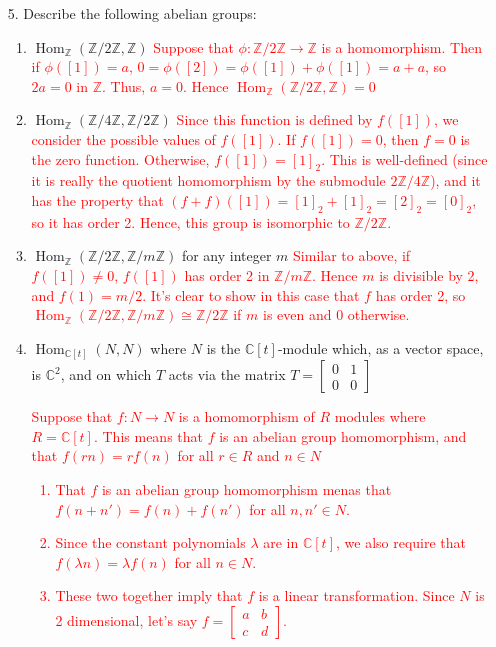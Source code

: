 \documentclass[12pt]{article}
\newcommand{\bbC}{\mathbb{C}}
\newcommand{\bbZ}{\mathbb{Z}}
\newcommand{\Hom}{\operatorname{Hom}}
\newcommand{\solution}[1]{\textcolor{red}{#1}}
\begin{document}
\begin{enumerate}
\item[5.] Describe the following abelian groups:
  \begin{enumerate}
  \item $\Hom_\bbZ (\bbZ/2\bbZ, \bbZ)$
\solution{Suppose that $\phi: \bbZ/2\bbZ\rightarrow \bbZ$ is a
  homomorphism. Then if $\phi([1])=a$,
  $0=\phi([2])=\phi([1])+\phi([1]) = a+a$, so $2a=0$ in $\bbZ$. Thus,
  $a=0$. Hence $\Hom_\bbZ(\bbZ/2\bbZ, \bbZ) = 0$}
  \item $\Hom_\bbZ (\bbZ/4\bbZ, \bbZ/2\bbZ)$
\solution{Since this function is defined by $f([1])$, we consider the
  possible values of $f([1])$. If $f([1])=0$, then $f=0$ is the zero
  function. Otherwise, $f([1])=[1]_2$. This is well-defined (since it
  is really the quotient homomorphism by the submodule $2\bbZ/4\bbZ$),
  and it has the property that $(f+f)([1])=[1]_2+[1]_2 = [2]_2 =
  [0]_2$, so it has order 2. Hence, this group is isomorphic to
  $\bbZ/2\bbZ$. }
  \item $\Hom_\bbZ(\bbZ/2\bbZ, \bbZ/m\bbZ)$ for any integer $m$
\solution{
Similar to above, if $f([1])\neq 0$, $f([1])$ has order 2 in
$\bbZ/m\bbZ$. Hence $m$ is divisible by 2, and $f(1)=m/2$. It's clear
to show in this case that $f$ has order 2, so $\Hom_\bbZ(\bbZ/2\bbZ,
\bbZ/m\bbZ) \cong \bbZ/2\bbZ$ if $m$ is even and 0 otherwise. 
}
  \item $\Hom_{\bbC[t]}(N, N)$ where $N$ is the $\bbC[t]$-module
    which, as a vector space, is $\bbC^2$, and on which $T$ acts via
    the matrix $T=\begin{bmatrix} 0 & 1 \\ 0 & 0 \end{bmatrix} $
\solution{
Suppose that $f: N\rightarrow N$ is a homomorphism of $R$ modules
where $R=\bbC[t]$. This means that $f$ is an abelian group
homomorphism, and that $f(r n) = rf(n)$ for all $r\in R$ and $n\in
N$
\begin{enumerate}
\item That $f$ is an abelian group homomorphism menas that
  $f(n+n')=f(n)+f(n')$ for all $n, n'\in N$. 
\item Since the constant polynomials $\lambda$ are in $\bbC[t]$, we
  also require that $f(\lambda n) = \lambda f(n)$ for all $n\in
  N$. 
\item These two together imply that $f$ is a linear
  transformation. Since $N$ is 2 dimensional, let's say
  $f= \begin{bmatrix} a & b \\ c & d \end{bmatrix}.$

\end{enumerate}}
\end{enumerate}
\end{enumerate}
\end{document}
